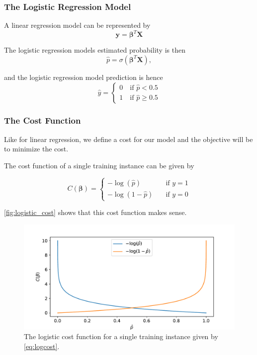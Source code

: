 \subsubsection{The Logistic Regression Model}

A linear regression model can be represented by
\begin{equation}
    \bm{y} = \bm{\beta}^T \bm{X}
\end{equation}

The logistic regression models estimated probability is then
\begin{equation}
    \hat{p} = \sigma (\bm{\beta}^T \bm{X}),
\end{equation}

and the logistic regression model prediction is hence
\begin{equation}
\hat{y} = \begin{cases} 0 \quad \text{if } \hat{p} < 0.5 \\ 1 \quad \text{if } \hat{p} \geq 0.5 \end{cases} 
\end{equation}


\subsubsection{The Cost Function}
Like for linear regression, we define a cost for our model and the objective will be to minimize the cost.

The cost function of a single training instance can be given by

\begin{equation}\label{eq:logcost}
    C(\bm{\beta}) = \begin{cases} - \log(\hat{p}) &\quad \text{if } y=1 \\ - \log(1-\hat{p}) &\quad \text{if } y=0  \end{cases}
\end{equation}

\autoref{fig:logistic_cost} shows that this cost function makes sense.

\begin{figure}[H]
\begin{center}\includegraphics[scale=0.6]{latex/figures/logistic_cost_func.pdf}
\end{center}
\caption{The logistic cost function for a single training instance given by \autoref{eq:logcost}.}
\label{fig:logistic_cost}
\end{figure}

